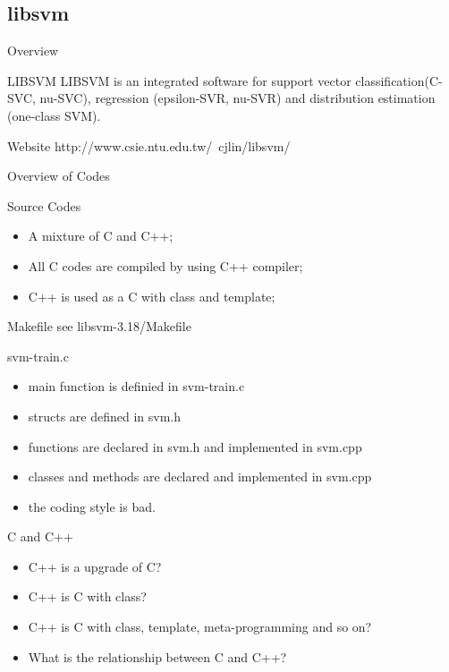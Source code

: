 \documentclass[UTF8]{beamer}
\begin{document}
\subsection{libsvm}

\begin{frame}[t]{Overview}
\begin{block}{LIBSVM}
  LIBSVM is an integrated software for support vector
  classification(C-SVC, nu-SVC), regression (epsilon-SVR, nu-SVR) and
  distribution estimation (one-class SVM).
\end{block}

\begin{block}{Website}
  http://www.csie.ntu.edu.tw/~cjlin/libsvm/
\end{block}
\end{frame}

\begin{frame}[t]{Overview of Codes}
  \begin{block}{Source Codes}
    \begin{itemize}
      \item A mixture of C and C++;
      \item All C codes are compiled by using C++ compiler;
      \item C++ is used as a C with class and template;
    \end{itemize}
  \end{block}
\end{frame}

\begin{frame}[t]{Makefile}
  see libsvm-3.18/Makefile
\end{frame}

\begin{frame}[t]{svm-train.c}
  \begin{itemize}
    \item main function is definied in svm-train.c
    \item structs are defined in svm.h
    \item functions are declared in svm.h and implemented in svm.cpp
    \item classes and methods are declared and implemented in svm.cpp
    \pause \item the coding style is bad.
  \end{itemize}
\end{frame}

\begin{frame}[t]{C and C++}
  \begin{itemize}
    \item C++ is a upgrade of C?
    \item C++ is C with class?
    \item C++ is C with class, template, meta-programming and so on?
    \item What is the relationship between C and C++?
  \end{itemize}
\end{frame}
\end{document}

